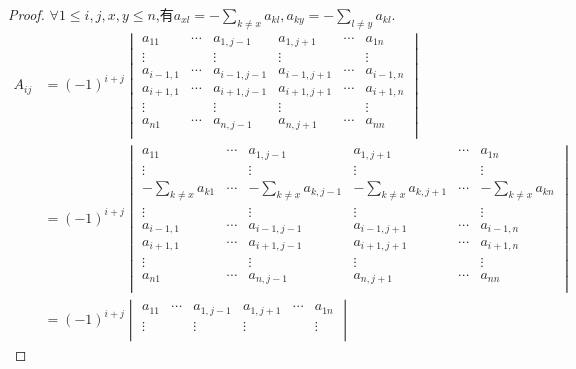 \documentclass{article}
\begin{document}
\begin{enumerate}
    \begin{proof}
        $\forall 1\leq i,j,x,y\leq n$,有$a_{xl}=-\sum\limits_{k\neq x}a_{kl},a_{ky}=-\sum\limits_{l\neq y}a_{kl}$.
        \begin{align*}
            A_{ij}&={(-1)}^{i+j}
            \begin{vmatrix}
                a_{11} & \cdots & a_{1,j-1} & a_{1,j+1} & \cdots & a_{1n} \\
                \vdots &        & \vdots & \vdots & & \vdots\\
                a_{i-1,1} & \cdots & a_{i-1,j-1} & a_{i-1,j+1} &\cdots & a_{i-1,n}\\
                a_{i+1,1} & \cdots & a_{i+1,j-1} & a_{i+1,j+1} &\cdots & a_{i+1,n}\\
                \vdots &        & \vdots & \vdots & & \vdots\\
                a_{n1} & \cdots & a_{n,j-1} & a_{n,j+1} & \cdots & a_{nn} \\
            \end{vmatrix}\\
            &={(-1)}^{i+j}
            \begin{vmatrix}
                a_{11} & \cdots & a_{1,j-1} & a_{1,j+1} & \cdots & a_{1n} \\
                \vdots &        & \vdots & \vdots & & \vdots\\
                -\sum\limits_{k\neq x}a_{k1} & \cdots & -\sum\limits_{k\neq x}a_{k,j-1} & -\sum\limits_{k\neq x}a_{k,j+1} & \cdots & -\sum\limits_{k\neq x}a_{kn}\\
                \vdots &        & \vdots & \vdots & & \vdots\\
                a_{i-1,1} & \cdots & a_{i-1,j-1} & a_{i-1,j+1} &\cdots & a_{i-1,n}\\
                a_{i+1,1} & \cdots & a_{i+1,j-1} & a_{i+1,j+1} &\cdots & a_{i+1,n}\\
                \vdots &        & \vdots & \vdots & & \vdots\\
                a_{n1} & \cdots & a_{n,j-1} & a_{n,j+1} & \cdots & a_{nn} \\
            \end{vmatrix}\\
            &={(-1)}^{i+j}
            \begin{vmatrix}
                a_{11} & \cdots & a_{1,j-1} & a_{1,j+1} & \cdots & a_{1n} \\
                \vdots &        & \vdots & \vdots & & \vdots\\

\end{vmatrix}
\end{align*}
\end{proof}
\end{enumerate}
\end{document}
